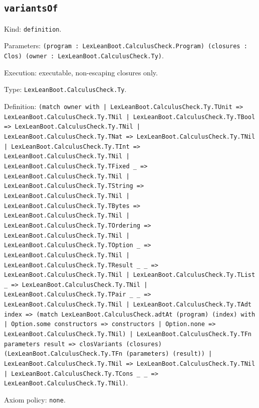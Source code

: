 \documentclass[11pt]{article}
\begin{document}
\subsection*{\texttt{variantsOf}}
\noindent Kind: \texttt{definition}.\par
\noindent Parameters: \texttt{(program : LexLeanBoot.CalculusCheck.Program) (closures : Clos) (owner : LexLeanBoot.CalculusCheck.Ty)}.\par
\noindent Execution: executable, non-escaping closures only.\par
\noindent Type: \texttt{LexLeanBoot.CalculusCheck.Ty}.\par
\noindent Definition: \texttt{(match owner with | LexLeanBoot.CalculusCheck.Ty.TUnit => LexLeanBoot.CalculusCheck.Ty.TNil | LexLeanBoot.CalculusCheck.Ty.TBool => LexLeanBoot.CalculusCheck.Ty.TNil | LexLeanBoot.CalculusCheck.Ty.TNat => LexLeanBoot.CalculusCheck.Ty.TNil | LexLeanBoot.CalculusCheck.Ty.TInt => LexLeanBoot.CalculusCheck.Ty.TNil | LexLeanBoot.CalculusCheck.Ty.TFixed \_ => LexLeanBoot.CalculusCheck.Ty.TNil | LexLeanBoot.CalculusCheck.Ty.TString => LexLeanBoot.CalculusCheck.Ty.TNil | LexLeanBoot.CalculusCheck.Ty.TBytes => LexLeanBoot.CalculusCheck.Ty.TNil | LexLeanBoot.CalculusCheck.Ty.TOrdering => LexLeanBoot.CalculusCheck.Ty.TNil | LexLeanBoot.CalculusCheck.Ty.TOption \_ => LexLeanBoot.CalculusCheck.Ty.TNil | LexLeanBoot.CalculusCheck.Ty.TResult \_ \_ => LexLeanBoot.CalculusCheck.Ty.TNil | LexLeanBoot.CalculusCheck.Ty.TList \_ => LexLeanBoot.CalculusCheck.Ty.TNil | LexLeanBoot.CalculusCheck.Ty.TPair \_ \_ => LexLeanBoot.CalculusCheck.Ty.TNil | LexLeanBoot.CalculusCheck.Ty.TAdt index => (match LexLeanBoot.CalculusCheck.adtAt (program) (index) with | Option.some constructors => constructors | Option.none => LexLeanBoot.CalculusCheck.Ty.TNil) | LexLeanBoot.CalculusCheck.Ty.TFn parameters result => closVariants (closures) (LexLeanBoot.CalculusCheck.Ty.TFn (parameters) (result)) | LexLeanBoot.CalculusCheck.Ty.TNil => LexLeanBoot.CalculusCheck.Ty.TNil | LexLeanBoot.CalculusCheck.Ty.TCons \_ \_ => LexLeanBoot.CalculusCheck.Ty.TNil)}.\par
\noindent Axiom policy: \texttt{none}.\par
\end{document}
